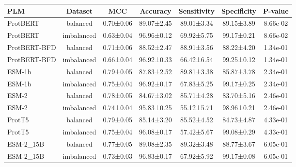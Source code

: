 \begin{tabular}{lcccccc}
\toprule
         PLM &    Dataset &       MCC &   Accuracy & Sensitivity & Specificity &  P-value \\
\midrule
    ProtBERT &   balanced & 0.70±0.06 & 89.07±2.45 &  89.01±3.34 &  89.15±3.89 & 8.66e-02 \\
    ProtBERT & imbalanced & 0.63±0.04 & 96.96±0.12 &  69.92±5.75 &  99.17±0.21 & 8.66e-02 \\
ProtBERT-BFD &   balanced & 0.71±0.06 & 88.52±2.47 &  88.91±3.56 &  88.22±4.20 & 1.34e-01 \\
ProtBERT-BFD & imbalanced & 0.66±0.04 & 96.92±0.33 &  66.42±6.54 &  99.25±0.12 & 1.34e-01 \\
      ESM-1b &   balanced & 0.79±0.05 & 87.83±2.52 &  89.81±3.38 &  85.87±3.78 & 2.34e-01 \\
      ESM-1b & imbalanced & 0.75±0.04 & 96.92±0.17 &  67.83±5.25 &  99.17±0.25 & 2.34e-01 \\
       ESM-2 &   balanced & 0.78±0.05 & 84.67±3.02 &  85.71±4.28 &  83.70±5.16 & 2.46e-01 \\
       ESM-2 & imbalanced & 0.74±0.04 & 95.83±0.25 &  55.12±5.71 &  98.96±0.21 & 2.46e-01 \\
      ProtT5 &   balanced & 0.79±0.05 & 85.14±3.20 &  85.52±4.52 &  84.73±4.87 & 4.33e-01 \\
      ProtT5 & imbalanced & 0.75±0.04 & 96.08±0.17 &  57.42±5.67 &  99.08±0.29 & 4.33e-01 \\
   ESM-2_15B &   balanced & 0.77±0.05 & 89.08±2.35 &  89.32±3.48 &  88.77±3.67 & 6.05e-01 \\
   ESM-2_15B & imbalanced & 0.73±0.03 & 96.83±0.17 &  67.92±5.92 &  99.17±0.08 & 6.05e-01 \\
\bottomrule
\end{tabular}
